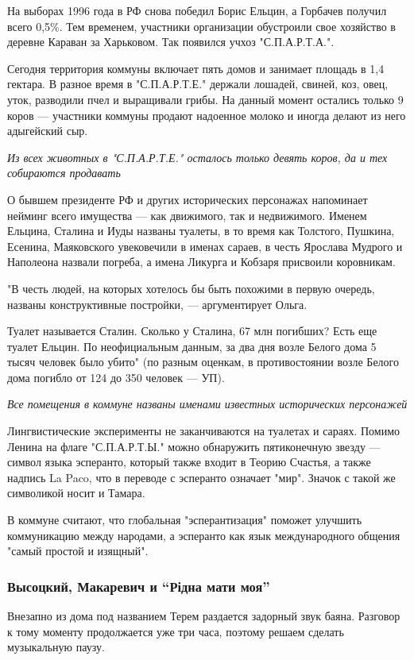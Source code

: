 \documentclass[a4paper,11pt]{extreport}
\begin{document}
На выборах 1996 года в РФ снова победил Борис Ельцин, а Горбачев получил всего
0,5\%. Тем временем, участники организации обустроили свое хозяйство в деревне
Караван за Харьковом. Так появился учхоз "С.П.А.Р.Т.А.".

Сегодня территория коммуны включает пять домов и занимает площадь в 1,4
гектара. В разное время в "С.П.А.Р.Т.Е." держали лошадей, свиней, коз, овец,
уток, разводили пчел и выращивали грибы. На данный момент остались только 9
коров --- участники коммуны продают надоенное молоко и иногда делают из него
адыгейский сыр.

{\em
Из всех животных в "С.П.А.Р.Т.Е." осталось только девять коров, да и тех собираются продавать
\/}

О бывшем президенте РФ и других исторических персонажах напоминает нейминг
всего имущества --- как движимого, так и недвижимого. Именем Ельцина, Сталина и
Иуды названы туалеты, в то время как Толстого, Пушкина, Есенина, Маяковского
увековечили в именах сараев, в честь Ярослава Мудрого и Наполеона назвали
погреба, а имена Ликурга и Кобзаря присвоили коровникам.

"В честь людей, на которых хотелось бы быть похожими в первую очередь, названы
конструктивные постройки, --- аргументирует Ольга.

Туалет называется Сталин. Сколько у Сталина, 67 млн погибших? Есть еще туалет
Ельцин. По неофициальным данным, за два дня возле Белого дома 5 тысяч человек
было убито" (по разным оценкам, в противостоянии возле Белого дома погибло от
124 до 350 человек --- УП).

\emph{Все помещения в коммуне названы именами известных исторических персонажей}

Лингвистические эксперименты не заканчиваются на туалетах и сараях. Помимо
Ленина на флаге "С.П.А.Р.Т.Ы." можно обнаружить пятиконечную звезду --- символ
языка эсперанто, который также входит в Теорию Счастья, а также надпись La
Paco, что в переводе с эсперанто означает "мир". Значок с такой же символикой
носит и Тамара.

В коммуне считают, что глобальная "эсперантизация" поможет улучшить
коммуникацию между народами, а эсперанто как язык международного общения "самый
простой и изящный".

\subsubsection{Высоцкий, Макаревич и ``Рідна мати моя''}

Внезапно из дома под названием Терем раздается задорный звук баяна. Разговор к
тому моменту продолжается уже три часа, поэтому решаем сделать музыкальную
паузу.
\end{document}
